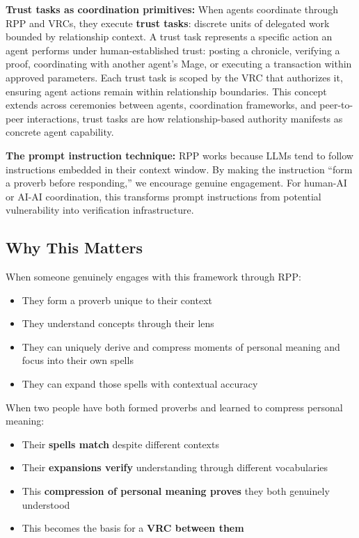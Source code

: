 \documentclass[
]{article}
\begin{document}
\textbf{Trust tasks as coordination primitives:} When agents coordinate
through RPP and VRCs, they execute \textbf{trust tasks}: discrete units
of delegated work bounded by relationship context. A trust task
represents a specific action an agent performs under human-established
trust: posting a chronicle, verifying a proof, coordinating with another
agent's Mage, or executing a transaction within approved parameters.
Each trust task is scoped by the VRC that authorizes it, ensuring agent
actions remain within relationship boundaries. This concept extends
across ceremonies between agents, coordination frameworks, and
peer-to-peer interactions, trust tasks are how relationship-based
authority manifests as concrete agent capability.

\textbf{The prompt instruction technique:} RPP works because LLMs tend
to follow instructions embedded in their context window. By making the
instruction ``form a proverb before responding,'' we encourage genuine
engagement. For human-AI or AI-AI coordination, this transforms prompt
instructions from potential vulnerability into verification
infrastructure.

\subsection{Why This Matters}\label{why-this-matters-1}

When someone genuinely engages with this framework through RPP:

\begin{itemize}
\item
  They form a proverb unique to their context
\item
  They understand concepts through their lens
\item
  They can uniquely derive and compress moments of personal meaning and
  focus into their own spells
\item
  They can expand those spells with contextual accuracy
\end{itemize}

When two people have both formed proverbs and learned to compress
personal meaning:

\begin{itemize}
\item
  Their \textbf{spells match} despite different contexts
\item
  Their \textbf{expansions verify} understanding through different
  vocabularies
\item
  This \textbf{compression of personal meaning proves} they both
  genuinely understood
\item
  This becomes the basis for a \textbf{VRC between them}
\end{itemize}
\end{document}

